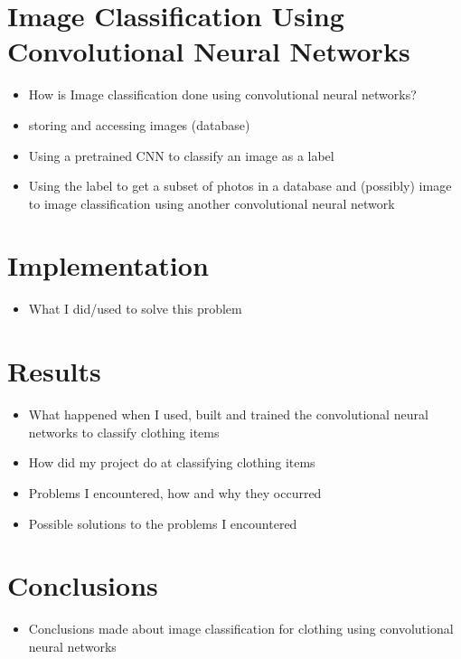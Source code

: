 \documentclass[12pt]{article} %
\begin{document}
\section{Image Classification Using Convolutional Neural Networks}
\begin{itemize}
\item How is Image classification done using convolutional neural networks?
\item storing and accessing images (database)
\item Using a pretrained CNN to classify an image as a label
\item Using the label to get a subset of photos in a database and (possibly) image to image classification using another convolutional neural network
\end{itemize}

\section{Implementation}
\begin{itemize}
\item What I did/used to solve this problem
\end{itemize}

\section{Results}
\begin{itemize}
\item What happened when I used, built and trained the convolutional neural networks to classify clothing items
\item How did my project do at classifying clothing items
\item Problems I encountered, how and why they occurred
\item Possible solutions to the problems I encountered
\end{itemize}

\section{Conclusions}
\begin{itemize}
\item Conclusions made about image classification for clothing using convolutional neural networks
\end{itemize}





\end{document}

